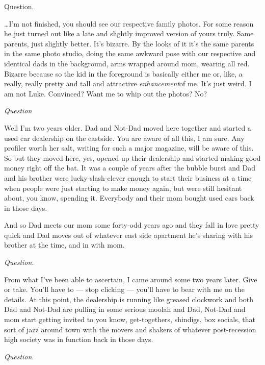 Question.



{\ldots}I'm not finished, you should see our respective
family photos. For some reason he just turned out like a late and
slightly improved version of yours truly. Same parents, just
slightly better. It's bizarre. By the looks of it it's
the same parents in the same photo studio, doing the same awkward
pose with our respective and identical dads in the background, arms
wrapped around mom, wearing all red. Bizarre because so the kid in
the foreground is basically either me or, like, a really, really
pretty and tall and attractive {\em enhancement}of me. It's
just weird. I am not Luke. Convinced? Want me to whip out the
photos? No?



{\em Question}



Well I'm two years older. Dad and Not-Dad moved here together
and started a used car dealership on the eastside. You are aware of
all this, I am sure. Any profiler worth her salt, writing for such
a major magazine, will be aware of this. So but they moved here,
yes, opened up their dealership and started making good money right
off the bat. It was a couple of years after the bubble burst and
Dad and his brother were lucky-slash-clever enough to start their
business at a time when people were just starting to make money
again, but were still hesitant about, you know, spending it.
Everybody and their mom bought used cars back in those days.

And so Dad meets our mom some forty-odd years ago and they fall in
love pretty quick and Dad moves out of whatever east side apartment
he's sharing with his brother at the time, and in with
mom.



{\em Question}.



From what I've been able to ascertain, I came around some two
years later. Give or take. You'll have to --- stop
clicking --- you'll have to bear with me on the details.
At this point, the dealership is running like greased clockwork and
both Dad and Not-Dad are pulling in some serious moolah and Dad,
Not-Dad and mom start getting invited to you know, get-togethers,
shindigs, box socials, that sort of jazz around town with the
movers and shakers of whatever post-recession high society was in
function back in those days.



{\em Question}.



